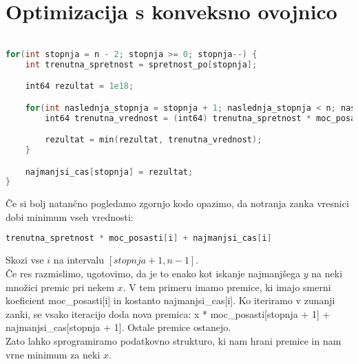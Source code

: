 \section{Optimizacija s konveksno ovojnico}\label{sec:optimizacija-s-konveksno-ovojnico}

\begin{lstlisting}[label={lst:code3}, language=C++]

for(int stopnja = n - 2; stopnja >= 0; stopnja--) {
    int trenutna_spretnost = spretnost_po[stopnja];

    int64 rezultat = 1e18;

    for(int naslednja_stopnja = stopnja + 1; naslednja_stopnja < n; naslednja_stopnja++) {
        int64 trenutna_vrednost = (int64) trenutna_spretnost * moc_posasti[naslednja_stopnja] + najmanjsi_cas[naslednja_stopnja];

        rezultat = min(rezultat, trenutna_vrednost);
    }

    najmanjsi_cas[stopnja] = rezultat;
}

\end{lstlisting}

Če si bolj natančno pogledamo zgornjo kodo opazimo, da notranja zanka vresnici dobi minimum vseh vrednosti:

\begin{lstlisting}[label={lst:code4}, language=C++]
    trenutna_spretnost * moc_posasti[i] + najmanjsi_cas[i]
\end{lstlisting}

Skozi vse $i$ na intervalu $[stopnja+1, n-1]$.
\\
Če res razmislimo, ugotovimo, da je to enako kot iskanje najmanjšega $y$ na neki množici premic pri nekem $x$.
V tem primeru imamo premice, ki imajo smerni koeficient moc\_posasti[i] in kostanto najmanjsi\_cas[i].
Ko iteriramo v zunanji zanki, se vsako iteracijo doda nova premica: x * moc\_posasti[stopnja + 1] + najmanjsi\_cas[stopnja + 1].
Ostale premice ostanejo.
\\
Zato lahko sprogramiramo podatkovno strukturo, ki nam hrani premice in nam vrne minimum za neki $x$.

